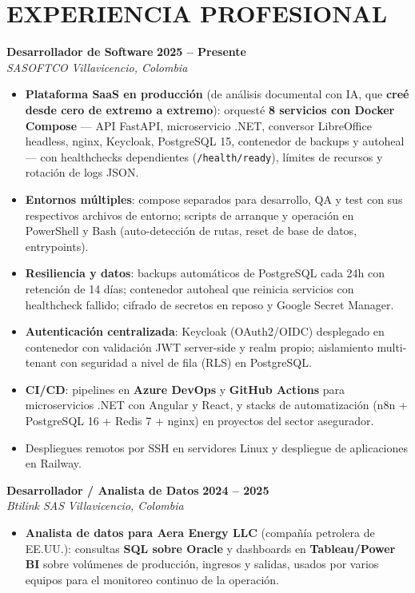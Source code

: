 \documentclass[letterpaper,10pt]{article}
\begin{document}
\section{EXPERIENCIA PROFESIONAL}

\textbf{Desarrollador de Software} \hfill \textbf{2025 -- Presente} \\
\textit{SASOFTCO} \hfill \textit{Villavicencio, Colombia}
\begin{itemize}
    \item \textbf{Plataforma SaaS en producción} (de análisis documental con IA, que \textbf{creé desde cero de extremo a extremo}): orquesté \textbf{8 servicios con Docker Compose} — API FastAPI, microservicio .NET, conversor LibreOffice headless, nginx, Keycloak, PostgreSQL 15, contenedor de backups y autoheal — con healthchecks dependientes (\texttt{/health/ready}), límites de recursos y rotación de logs JSON.
    \item \textbf{Entornos múltiples}: compose separados para desarrollo, QA y test con sus respectivos archivos de entorno; scripts de arranque y operación en PowerShell y Bash (auto-detección de rutas, reset de base de datos, entrypoints).
    \item \textbf{Resiliencia y datos}: backups automáticos de PostgreSQL cada 24h con retención de 14 días; contenedor autoheal que reinicia servicios con healthcheck fallido; cifrado de secretos en reposo y Google Secret Manager.
    \item \textbf{Autenticación centralizada}: Keycloak (OAuth2/OIDC) desplegado en contenedor con validación JWT server-side y realm propio; aislamiento multi-tenant con seguridad a nivel de fila (RLS) en PostgreSQL.
    \item \textbf{CI/CD}: pipelines en \textbf{Azure DevOps} y \textbf{GitHub Actions} para microservicios .NET con Angular y React, y stacks de automatización (n8n + PostgreSQL 16 + Redis 7 + nginx) en proyectos del sector asegurador.
    \item Despliegues remotos por SSH en servidores Linux y despliegue de aplicaciones en Railway.
\end{itemize}

\textbf{Desarrollador / Analista de Datos} \hfill \textbf{2024 -- 2025} \\
\textit{Btilink SAS} \hfill \textit{Villavicencio, Colombia}
\begin{itemize}
    \item \textbf{Analista de datos para Aera Energy LLC} (compañía petrolera de EE.UU.): consultas \textbf{SQL sobre Oracle} y dashboards en \textbf{Tableau/Power BI} sobre volúmenes de producción, ingresos y salidas, usados por varios equipos para el monitoreo continuo de la operación.
\end{itemize}
\end{document}
